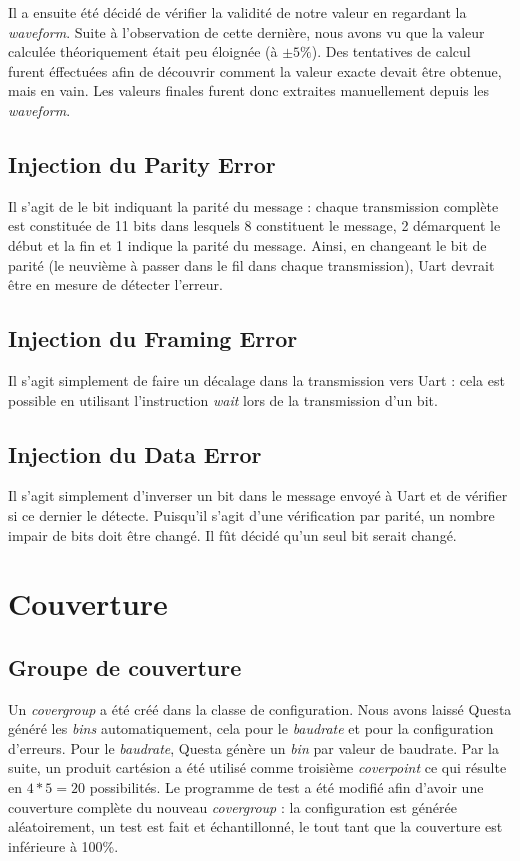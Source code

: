 \documentclass[12pt, titlepage]{article}
\newcommand{\theDut}{Uart }
\newcommand{\cvp}{\emph{coverpoint }}                \newcommand{\cvg}{\emph{covergroup }}
\begin{document}
	Il a ensuite été décidé de vérifier la validité de notre valeur en regardant la \emph{waveform}. Suite à l'observation de cette dernière, nous avons vu que la valeur calculée théoriquement était peu éloignée (à $ \pm5 \%$). Des tentatives de calcul furent éffectuées afin de découvrir comment la valeur exacte devait être obtenue, mais en vain. Les valeurs finales furent donc extraites manuellement depuis les \emph{waveform}.
    \subsection{Injection du Parity Error} 
    	Il s'agit de le bit indiquant la parité du message : chaque transmission complète est constituée de 11 bits dans lesquels 8 constituent le message, 2 démarquent le début et la fin et 1 indique la parité du message. 
    	Ainsi, en changeant le bit de parité (le neuvième à passer dans le fil dans chaque transmission), \theDut devrait être en mesure de détecter l'erreur.
    	    	
    \subsection{Injection du Framing Error} 
    	Il s'agit simplement de faire un décalage dans la transmission vers \theDut : cela est possible en utilisant l'instruction \emph{wait} lors de la transmission d'un bit. 

    \subsection{Injection du Data Error} 
    	Il s'agit simplement d'inverser un bit dans le message envoyé à \theDut et de vérifier si ce dernier le détecte. Puisqu'il s'agit d'une vérification par parité, un nombre impair de bits doit être changé. Il fût décidé qu'un seul bit serait changé.

\section{Couverture}
    \subsection{Groupe de couverture} 
    	Un \cvg a été créé dans la classe de configuration. Nous avons laissé Questa généré les \emph{bins} automatiquement, cela pour le \emph{baudrate} et pour la configuration d'erreurs. Pour le \emph{baudrate}, Questa génère un \emph{bin} par valeur de baudrate. Par la suite, un produit cartésion a été utilisé comme troisième \cvp ce qui résulte en $4 * 5 = 20$ possibilités. 
		Le programme de test a été modifié afin d'avoir une couverture complète du nouveau \cvg : la configuration est générée aléatoirement, un test est fait et échantillonné, le tout tant que la couverture est inférieure à 100\%.
		
\end{document}
